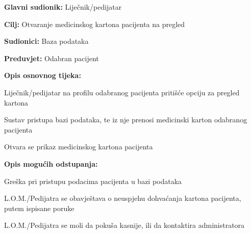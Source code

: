 					\noindent {}
					\begin{packed_item}
						
						\item \textbf{Glavni sudionik: }Liječnik/pedijatar
						\item  \textbf{Cilj:} Otvaranje medicinskog kartona pacijenta na pregled
						\item  \textbf{Sudionici:} Baza podataka
						\item  \textbf{Preduvjet:} Odabran pacijent
						\item  \textbf{Opis osnovnog tijeka:}
						
						\item[] \begin{packed_enum}
							
							\item Liječnik/pedijatar na profilu odabranog pacijenta pritišće opciju za pregled kartona
							\item Sustav pristupa bazi podataka, te iz nje prenosi medicinski karton odabranog pacijenta
							\item Otvara se prikaz medicinskog kartona pacijenta
						\end{packed_enum}
						\item  \textbf{Opis mogućih odstupanja:}
						\item[] \begin{packed_item}
							
							\item[2.a] Greška pri pristupu podacima pacijenta u bazi podataka
							\item[] \begin{packed_enum}
								
								\item L.O.M./Pedijatra se obavještava o neuspjehu dohvaćanja kartona pacijenta, putem ispisane poruke
								\item L.O.M./Pedijatra se moli da pokuša kasnije, ili da kontaktira administratora
								
							\end{packed_enum}
						\end{packed_item}
					\end{packed_item}
					
